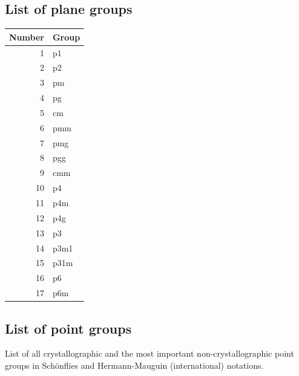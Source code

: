 \documentclass[12pt]{article}
\begin{document}


\newpage
\subsection{List of plane groups}

\begin{center}
\begin{tabular}{|r|l|}
\hline
Number & Group \\
\hline
 1 & p1   \\
 2 & p2   \\
 3 & pm   \\
 4 & pg   \\
 5 & cm   \\
 6 & pmm  \\
 7 & pmg  \\
 8 & pgg  \\
 9 & cmm  \\
10 & p4   \\
11 & p4m  \\
12 & p4g  \\
13 & p3   \\
14 & p3m1 \\
15 & p31m \\
16 & p6   \\
17 & p6m  \\
\hline
\end{tabular}
\end{center}

\newpage
\subsection{List of point groups}

List of all crystallographic and the most important non-crystallographic point
groups in Sch\"onflies and Hermann-Mauguin (international) notations.

\vspace{1cm}
\end{document}
